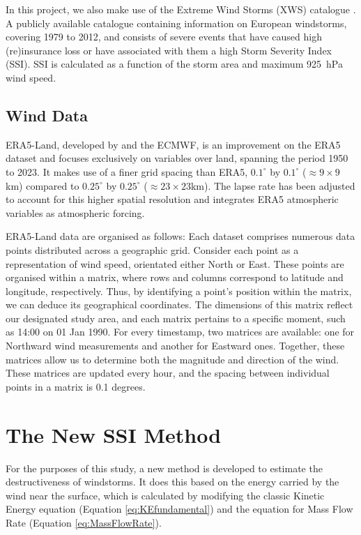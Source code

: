         In this project, we also make use of the Extreme Wind Storms (XWS) catalogue \citep{XWS-nhess-14-2487-2014}. A publicly available catalogue containing information on European windstorms, covering 1979 to 2012, and consists of severe events that have caused high (re)insurance loss or have associated with them a high Storm Severity Index (SSI). SSI is calculated as a function of the storm area and maximum 925~hPa wind speed.
        
    \subsection{Wind Data}

        ERA5-Land, developed by \cite{munoz2019era5land} and the ECMWF, is an improvement on the ERA5 dataset and focuses exclusively on variables over land, spanning the period 1950 to 2023. It makes use of a finer grid spacing than ERA5, $0.1^\circ$ by $0.1^\circ$ ($\approx 9 \times 9 $km) compared to $0.25^\circ$ by $0.25^\circ$ ($\approx 23 \times 23 $km). The lapse rate has been adjusted to account for this higher spatial resolution and integrates ERA5 atmospheric variables as atmospheric forcing.

        ERA5-Land data are organised as follows: Each dataset comprises numerous data points distributed across a geographic grid. Consider each point as a representation of wind speed, orientated either North or East. These points are organised within a matrix, where rows and columns correspond to latitude and longitude, respectively. Thus, by identifying a point's position within the matrix, we can deduce its geographical coordinates. The dimensions of this matrix reflect our designated study area, and each matrix pertains to a specific moment, such as 14:00 on 01 Jan 1990. For every timestamp, two matrices are available: one for Northward wind measurements and another for Eastward ones. Together, these matrices allow us to determine both the magnitude and direction of the wind. These matrices are updated every hour, and the spacing between individual points in a matrix is 0.1 degrees.

\section{The New SSI Method}

    For the purposes of this study, a new method is developed to estimate the destructiveness of windstorms. It does this based on the energy carried by the wind near the surface, which is calculated by modifying the classic Kinetic Energy equation (Equation \ref{eq:KEfundamental}) and the equation for Mass Flow Rate (Equation \ref{eq:MassFlowRate}).
    
